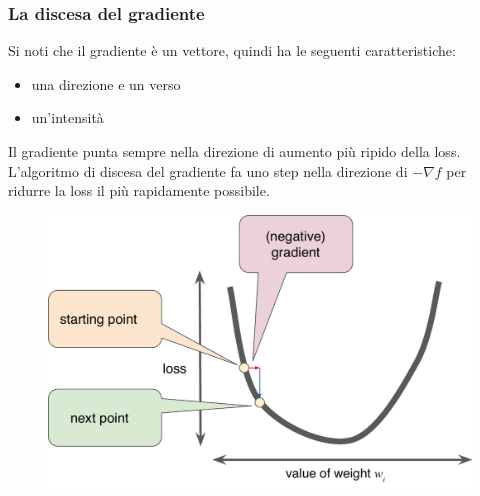 \begin{frame}

	\frametitle{La discesa del gradiente}

		Si noti che il gradiente è un vettore, quindi ha le seguenti caratteristiche:
		\begin{itemize}
			\item una direzione e un verso
			\item un'intensità
		\end{itemize}

		Il gradiente punta sempre nella direzione di aumento più ripido della loss.\\
		L'algoritmo di discesa del gradiente fa uno step nella direzione di $-\nabla f$ per ridurre la loss il più rapidamente possibile.

		\begin{figure}[!htbp]
			\centering
			\includegraphics[width=0.5\linewidth]{images/supervised/training_reducing_loss/GradientDescentGradientStep.pdf}
		\end{figure}

\end{frame}



